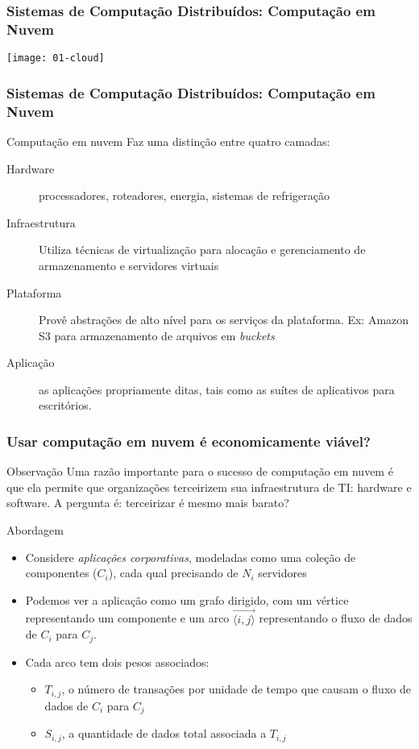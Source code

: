 \documentclass[Ligatures=TeX,table,brazil,svgnames,usetotalslideindicator,compress,10pt]{beamer}
\begin{document}
\begin{frame}
  \frametitle{Sistemas de Computação Distribuídos: Computação em Nuvem}
  \texttt{[image: 01-cloud]}
\end{frame}

\begin{frame}
  \frametitle{Sistemas de Computação Distribuídos: Computação em Nuvem}

  \begin{block}{Computação em nuvem}
    Faz uma distinção entre quatro camadas:

    \begin{description}
    \item[Hardware] processadores, roteadores, energia, sistemas de refrigeração
    \item[Infraestrutura] Utiliza técnicas de virtualização para alocação e gerenciamento de armazenamento e servidores virtuais
    \item[Plataforma] Provê abstrações de alto nível para os serviços da plataforma. Ex: Amazon S3 para armazenamento de arquivos em \textit{buckets}
    \item[Aplicação] as aplicações propriamente ditas, tais como as suítes de aplicativos para escritórios.
    \end{description}

  \end{block}

\end{frame}

\begin{frame}
  \frametitle{Usar computação em nuvem é economicamente viável?}
  \begin{block}{Observação}
    Uma razão importante para o sucesso de computação em nuvem é que ela permite que organizações terceirizem sua infraestrutura de TI: hardware e software. A pergunta é: terceirizar é mesmo mais barato?
  \end{block}

  \begin{block}{Abordagem}
    \begin{itemize}
    \item Considere \emph{aplicações corporativas}, modeladas como uma coleção de componentes ($C_i$), cada qual precisando de $N_i$ servidores
    \item Podemos ver a aplicação como um \alert{grafo dirigido}, com um vértice representando um componente e um arco $\vec{\langle i,j \rangle}$ representando o fluxo de dados de $C_i$ para $C_j$.
    \item Cada arco tem dois pesos associados:
      \begin{itemize}
      \item $T_{i,j}$, o número de transações por unidade de tempo que causam o fluxo de dados de $C_i$ para $C_j$
      \item $S_{i,j}$, a quantidade de dados total associada a $T_{i,j}$
      \end{itemize}
    \end{itemize}
  \end{block}
\end{frame}
\end{document}
